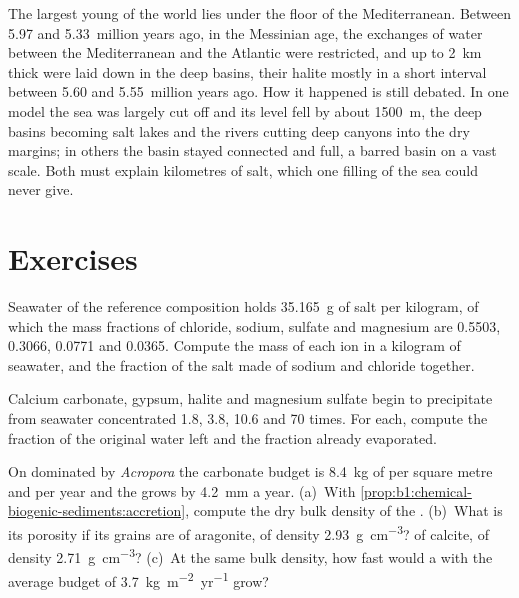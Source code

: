 The largest young  of the world lies under the floor of the
Mediterranean. Between 5.97 and 5.33~million years ago, in the Messinian age, the
exchanges of water between the Mediterranean and the Atlantic were restricted,
and  up to \qty{2}{km} thick were laid down in the deep basins, their
halite mostly in a short interval between 5.60 and 5.55~million years ago. How
it happened is still debated. In one model the sea was largely cut off and its
level fell by about \qty{1500}{m}, the deep basins becoming salt lakes and the
rivers cutting deep canyons into the dry margins; in others the basin stayed
connected and full, a barred basin on a vast scale. Both must explain
kilometres of salt, which one filling of the sea could never give.

\section{Exercises}

\begin{exercise}[$\star$]\label{exo:b1:chemical-biogenic-sediments:1}
Seawater of the reference composition holds \qty{35.165}{g} of salt per
kilogram, of which the mass fractions of chloride, sodium, sulfate and magnesium
are 0.5503, 0.3066, 0.0771 and 0.0365. Compute the mass of each ion in a kilogram
of seawater, and the fraction of the salt made of sodium and chloride together.
\end{exercise}

\begin{exercise}[$\star$]\label{exo:b1:chemical-biogenic-sediments:2}
Calcium carbonate, gypsum, halite and magnesium sulfate begin to precipitate
from seawater concentrated 1.8, 3.8, 10.6 and 70 times. For each, compute the
fraction of the original water left and the fraction already evaporated.
\end{exercise}

\begin{exercise}[$\star$]\label{exo:b1:chemical-biogenic-sediments:3}
On  dominated by \emph{Acropora} the carbonate budget is \qty{8.4}{kg} of
 per square metre and per year and the  grows by \qty{4.2}{mm} a
year. (a)~With \cref{prop:b1:chemical-biogenic-sediments:accretion}, compute the
dry bulk density of the . (b)~What is its porosity if its grains are of
aragonite, of density \qty{2.93}{g.cm^{-3}}? of calcite, of density
\qty{2.71}{g.cm^{-3}}? (c)~At the same bulk density, how fast would a  with
the average budget of \qty{3.7}{kg.m^{-2}.yr^{-1}} grow?
\end{exercise}

